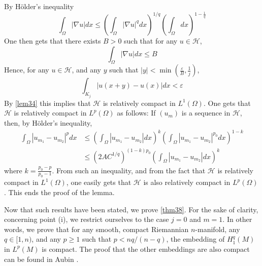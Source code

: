 \documentclass[12pt,hyperref,a4paper,UTF8]{ctexart}
\begin{document}
\begin{Proof}
$$$$
By Hölder's inequality
$$
\int_{\Omega}|\nabla u| d x \leq\left(\int_{\Omega}|\nabla u|^q d x\right)^{1 / q}\left(\int_{\Omega} d x\right)^{1-\frac{1}{q}}
$$
One then gets that there exists $B>0$ such that for any $u \in \mathcal{H}$,
$$
\int_{\Omega}|\nabla u| d x \leq B
$$
Hence, for any $u \in \mathcal{H}$, and any $y$ such that $|y|<\min \left(\frac{\varepsilon}{B}, \frac{1}{j}\right)$,
$$
\int_{K_j}|u(x+y)-u(x)| d x<\varepsilon
$$
By \autoref{lem34} this implies that $\mathcal{H}$ is relatively compact in $L^1(\Omega)$. One gets that $\mathcal{H}$ is relatively compact in $L^p(\Omega)$ as follows: If $\left(u_m\right)$ is a sequence in $\mathcal{H}$, then, by Hölder's inequality,
$$
\begin{aligned}
\int_{\Omega}\left|u_{m_1}-u_{m_2}\right|^p d x & \leq\left(\int_{\Omega}\left|u_{m_1}-u_{m_2}\right| d x\right)^k\left(\int_{\Omega}\left|u_{m_1}-u_{m_2}\right|^{p_0} d x\right)^{1-k} \\
& \leq\left(2 A C^{1 / q}\right)^{(1-k) p_0}\left(\int_{\Omega}\left|u_{m_1}-u_{m_2}\right| d x\right)^k
\end{aligned}
$$
where $k=\frac{p_0-p}{p_0-1}$. From such an inequality, and from the fact that $\mathcal{H}$ is relatively compact in $L^1(\Omega)$, one easily gets that $\mathcal{H}$ is also relatively compact in $L^p(\Omega)$. This ends the proof of the lemma.
\end{Proof}

Now that such results have been stated, we prove \autoref{thm38}. For the sake of clarity, concerning point (i), we restrict ourselves to the case $j=0$ and $m=1$. In other words, we prove that for any smooth, compact Riemannian $n$-manifold, any $q \in[1, n)$, and any $p \geq 1$ such that $p<n q /(n-q)$, the embedding of $H_1^q(M)$ in $L^p(M)$ is compact. 
The proof that the other embeddings are also compact can be found in Aubin \cite{Aubin}.
\end{document}
